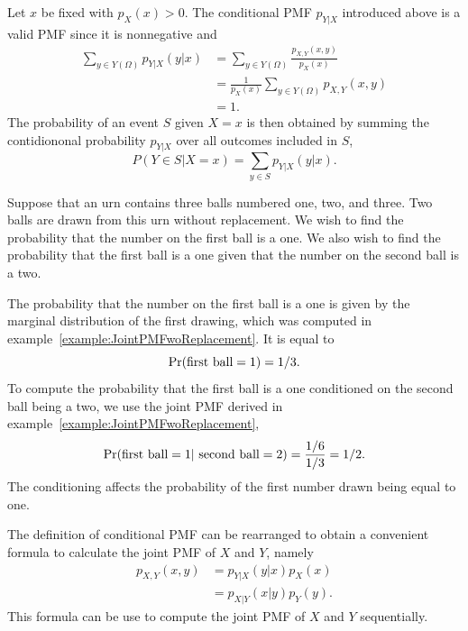 Let $x$ be fixed with $p_X (x) > 0$.
The conditional PMF $p_{Y|X}$ introduced above is a valid PMF since it is nonnegative and
\begin{equation*}
\begin{split}
\sum_{y \in Y(\Omega)} p_{Y|X} (y|x)
&= \sum_{y \in Y(\Omega)} \frac{p_{X,Y} (x,y)}{p_X (x)} \\
&= \frac{1}{p_X (x)} \sum_{y \in Y(\Omega)} p_{X,Y} (x,y) \\
&= 1.
\end{split}
\end{equation*}
The probability of an event $S$ given $X = x$ is then obtained by summing the contidiononal probability $p_{Y|X}$ over all outcomes included in $S$,
\begin{equation*}
P (Y \in S | X = x) = \sum_{y \in S} p_{Y|X} (y | x) .
\end{equation*}

\begin{example}
Suppose that an urn contains three balls numbered one, two, and three.
Two balls are drawn from this urn without replacement.
We wish to find the probability that the number on the first ball is a one.
We also wish to find the probability that the first ball is a one given that the number on the second ball is a two.

The probability that the number on the first ball is a one is given by the marginal distribution of the first drawing, which was computed in example~\ref{example:JointPMFwoReplacement}.
It is equal to
\begin{equation*}
\Pr ( \text{first ball} = 1) = 1/3.
\end{equation*}
To compute the probability that the first ball is a one conditioned on the second ball being a two, we use the joint PMF derived in example~\ref{example:JointPMFwoReplacement},
\begin{equation*}
\Pr (\text{first ball} =1 | \text{ second ball} =2) = \frac{1/6}{1/3} = 1/2 .
\end{equation*}
The conditioning affects the probability of the first number drawn being equal to one.
\end{example}

The definition of conditional PMF can be rearranged to obtain a convenient formula to calculate the joint PMF of $X$ and $Y$, namely
\begin{equation*}
\begin{split}
p_{X,Y} (x,y) &= p_{Y|X} (y|x) p_X (x) \\
& = p_{X|Y} (x|y) p_Y (y) .
\end{split}
\end{equation*}
This formula can be use to compute the joint PMF of $X$ and $Y$ sequentially.

